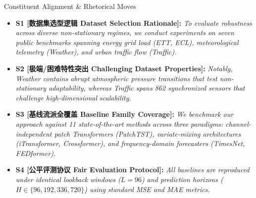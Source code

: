 \begin{TipBox}{Constituent Alignment \& Rhetorical Moves}
\begin{itemize}[leftmargin=1.5em]
  \item \textbf{S1 [数据集选型逻辑 Dataset Selection Rationale]:} \textit{To evaluate robustness across diverse non-stationary regimes, we conduct experiments on seven public benchmarks spanning energy grid load (ETT, ECL), meteorological telemetry (Weather), and urban traffic flow (Traffic).}\par{}
  \item \textbf{S2 [极端/困难特性突出 Challenging Dataset Properties]:} \textit{Notably, Weather contains abrupt atmospheric pressure transitions that test non-stationary adaptability, whereas Traffic spans 862 synchronized sensors that challenge high-dimensional scalability.}\par{}
  \item \textbf{S3 [基线流派全覆盖 Baseline Family Coverage]:} \textit{We benchmark our approach against 11 state-of-the-art methods across three paradigms: channel-independent patch Transformers (PatchTST), variate-mixing architectures (iTransformer, Crossformer), and frequency-domain forecasters (TimesNet, FEDformer).}\par{}
  \item \textbf{S4 [公平评测协议 Fair Evaluation Protocol]:} \textit{All baselines are reproduced under identical lookback windows ($L=96$) and prediction horizons ($H \in \{96, 192, 336, 720\}$) using standard MSE and MAE metrics.}\par{}
\end{itemize}
\end{TipBox}
\bigskip
